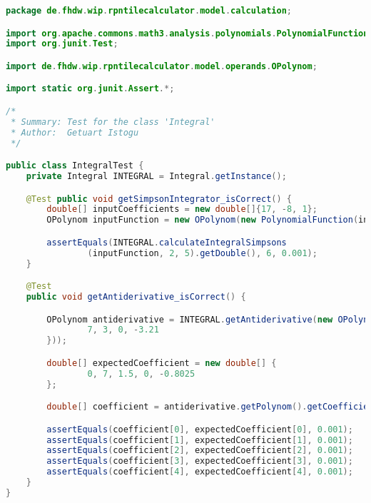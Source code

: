 \begin{lstlisting}[caption=IntegralTest (Istogu),label=list:IntegralTest,language=Java]
package de.fhdw.wip.rpntilecalculator.model.calculation;

import org.apache.commons.math3.analysis.polynomials.PolynomialFunction;
import org.junit.Test;

import de.fhdw.wip.rpntilecalculator.model.operands.OPolynom;

import static org.junit.Assert.*;

/*
 * Summary: Test for the class 'Integral'
 * Author:  Getuart Istogu
 */

public class IntegralTest {
    private Integral INTEGRAL = Integral.getInstance();

    @Test public void getSimpsonIntegrator_isCorrect() {
        double[] inputCoefficients = new double[]{17, -8, 1};
        OPolynom inputFunction = new OPolynom(new PolynomialFunction(inputCoefficients));

        assertEquals(INTEGRAL.calculateIntegralSimpsons
                (inputFunction, 2, 5).getDouble(), 6, 0.001);
    }

    @Test
    public void getAntiderivative_isCorrect() {

        OPolynom antiderivative = INTEGRAL.getAntiderivative(new OPolynom(new double[] {
                7, 3, 0, -3.21
        }));

        double[] expectedCoefficient = new double[] {
                0, 7, 1.5, 0, -0.8025
        };

        double[] coefficient = antiderivative.getPolynom().getCoefficients();

        assertEquals(coefficient[0], expectedCoefficient[0], 0.001);
        assertEquals(coefficient[1], expectedCoefficient[1], 0.001);
        assertEquals(coefficient[2], expectedCoefficient[2], 0.001);
        assertEquals(coefficient[3], expectedCoefficient[3], 0.001);
        assertEquals(coefficient[4], expectedCoefficient[4], 0.001);
    }
}
\end{lstlisting}    

